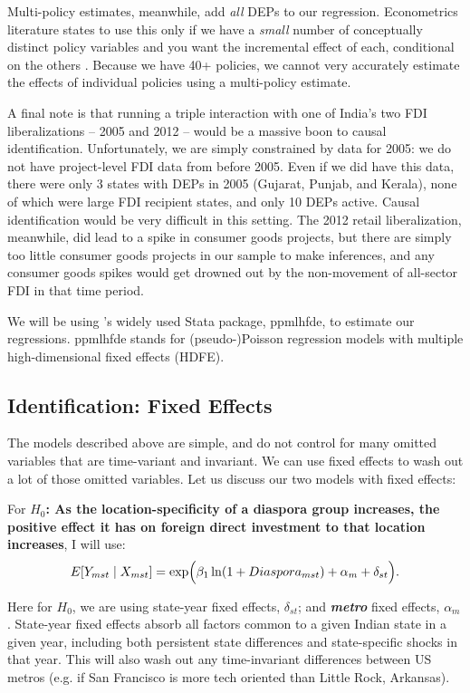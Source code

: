 \documentclass[12pt]{article}
\let\oldsubsection\subsection
\renewcommand{\subsection}{\FloatBarrier\oldsubsection}
\begin{document}
Multi-policy estimates, meanwhile, add \textit{all} DEPs to our regression. Econometrics literature states to use this only if we have a \textit{small} number of conceptually distinct policy variables and you want the incremental effect of each, conditional on the others \citep{yotov_advanced_nodate}. Because we have 40+ policies, we cannot very accurately estimate the effects of individual policies using a multi-policy estimate. 

A final note is that running a triple interaction with one of India's two FDI liberalizations -- 2005 and 2012 -- would be a massive boon to causal identification. Unfortunately, we are simply constrained by data for 2005: we do not have project-level FDI data from before 2005. Even if we did have this data, there were only 3 states with DEPs in 2005 (Gujarat, Punjab, and Kerala), none of which were large FDI recipient states, and only 10 DEPs active. Causal identification would be very difficult in this setting. The 2012 retail liberalization, meanwhile, did lead to a spike in consumer goods projects, but there are simply too little consumer goods projects in our sample to make inferences, and any consumer goods spikes would get drowned out by the non-movement of all-sector FDI in that time period.

We will be using \citet{correia_fast_2020}'s widely used Stata package, ppmlhfde, to estimate our regressions. ppmlhfde stands for (pseudo-)Poisson regression models with multiple high-dimensional fixed effects (HDFE).

\subsection{Identification: Fixed Effects}

The models described above are simple, and do not control for many omitted variables that are time-variant and invariant. We can use fixed effects to wash out a lot of those omitted variables. Let us discuss our two models with fixed effects:

For \textbf{$H_0$:  As the location-specificity of a diaspora group increases, the positive effect it has on foreign direct investment to that location increases}, I will use:
\[
E[Y_{mst} \mid X_{mst}] =
\exp \Bigl(
\beta_1 \ln(1+Diaspora_{mst})
+ \alpha_{m}
+ \delta_{st}
\Bigr).
\]

Here for $H_0$, we are using state-year fixed effects, $\delta_{st}$; and \textbf{\textit{metro}} fixed effects, $\alpha_{m}$. State-year fixed effects absorb all factors common to a given Indian state in a given year, including both persistent state differences and state-specific shocks in that year. This will also wash out any time-invariant differences between US metros (e.g. if San Francisco is more tech oriented than Little Rock, Arkansas).
\end{document}
